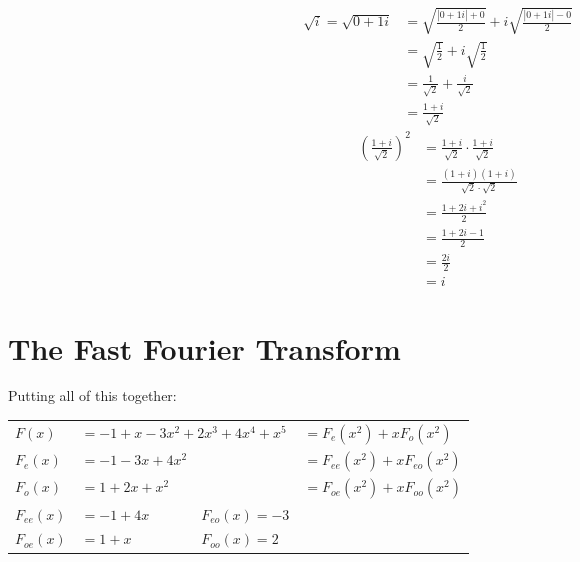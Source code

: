 \documentclass[12pt]{article}
\begin{document}
\begin{multicols}{2}
  \null \vfill
  \begin{align*}
    \sqrt{i} = \sqrt{0+1i} & = \sqrt{\frac{|0+1i| + 0}{2}} + i\sqrt{\frac{|0+1i| - 0}{2}} \\
                           & = \sqrt{\frac{1}{2}} + i\sqrt{\frac{1}{2}}                   \\
                           & = \frac{1}{\sqrt{2}} + \frac{i}{\sqrt{2}}                    \\
                           & = \frac{1+i}{\sqrt{2}}
  \end{align*}
  \vfill \null
  \columnbreak
  \null \vfill
  \begin{align*}
    \left(\frac{1+i}{\sqrt{2}}\right)^2 & = \frac{1+i}{\sqrt{2}} \cdot \frac{1+i}{\sqrt{2}} \\
                                        & = \frac{(1+i)(1+i)}{\sqrt{2}\cdot\sqrt{2}}        \\
                                        & = \frac{1+2i+i^2}{2}                              \\
                                        & = \frac{1+2i-1}{2}                                \\
                                        & = \frac{2i}{2}                                    \\
                                        & = i
  \end{align*}
  \vfill \null
\end{multicols}

\section{The Fast Fourier Transform}
Putting all of this together:
\begin{center}
  \begin{tabular}{llll}
    $F(x)$      & \multicolumn{2}{l}{$= -1+x-3x^2+2x^3+4x^4+x^5$} & $=F_e(x^2)+xF_o(x^2)$                                \\
    $F_e(x)$    & $=-1-3x+4x^2$                                   &                       & $=F_{ee}(x^2)+xF_{eo}(x^2)$  \\
    $F_o(x)$    & $=1+2x+x^2$                                     &                       & $= F_{oe}(x^2)+xF_{oo}(x^2)$ \\
    $F_{ee}(x)$ & $=-1+4x$                                        & $F_{eo}(x)=-3$        &                              \\
    $F_{oe}(x)$ & $=1+x$                                          & $F_{oo}(x)=2$         &                              \\
  \end{tabular}
\end{center}
\end{document}
